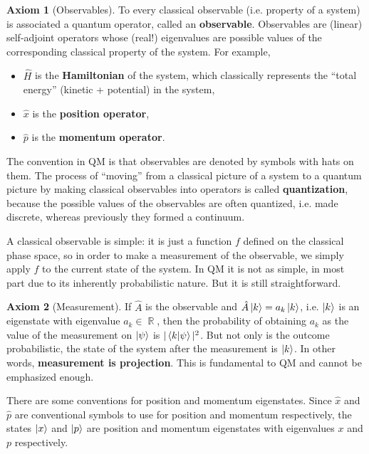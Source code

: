 \documentclass{report}
\theoremstyle{plain}
\theoremstyle{definition}
\newtheorem{axiom}{Axiom}
\theoremstyle{remark}
\DeclareMathOperator{\bR}{\mathbb{R}}
\begin{document}
\begin{axiom}[Observables]
  To every classical observable (i.e. property of a system) is
  associated a quantum operator, called an {\bf observable}.
  Observables are (linear) self-adjoint operators whose (real!)
  eigenvalues are possible values of the corresponding classical
  property of the system. For example,
  \begin{itemize}
  \item $\hat{H}$ is the {\bf Hamiltonian} of the system, which
    classically represents the ``total energy'' (kinetic + potential)
    in the system,
  \item $\hat{x}$ is the {\bf position operator},
  \item $\hat{p}$ is the {\bf momentum operator}.
  \end{itemize}
  The convention in QM is that observables are denoted by symbols with
  hats on them. The process of ``moving'' from a classical picture of
  a system to a quantum picture by making classical observables into
  operators is called {\bf quantization}, because the possible values
  of the observables are often quantized, i.e. made discrete, whereas
  previously they formed a continuum.
\end{axiom}

A classical observable is simple: it is just a function $f$ defined on
the classical phase space, so in order to make a measurement of the
observable, we simply apply $f$ to the current state of the system.
In QM it is not as simple, in most part due to its inherently
probabilistic nature. But it is still straightforward.

\begin{axiom}[Measurement]
  If $\hat{A}$ is the observable and $\hat{A}\ket{k} = a_k\ket{k}$,
  i.e. $\ket{k}$ is an eigenstate with eigenvalue $a_k \in \bR$, then
  the probability of obtaining $a_k$ as the value of the measurement
  on $\ket{\psi}$ is $|\braket{k|\psi}|^2$. But not only is the
  outcome probabilistic, the state of the system after the measurement
  is $\ket{k}$. In other words, {\bf measurement is projection}. This
  is fundamental to QM and cannot be emphasized enough.

  There are some conventions for position and momentum eigenstates.
  Since $\hat{x}$ and $\hat{p}$ are conventional symbols to use for
  position and momentum respectively, the states $\ket{x}$ and
  $\ket{p}$ are position and momentum eigenstates with eigenvalues $x$
  and $p$ respectively.
\end{axiom}
\end{document}
